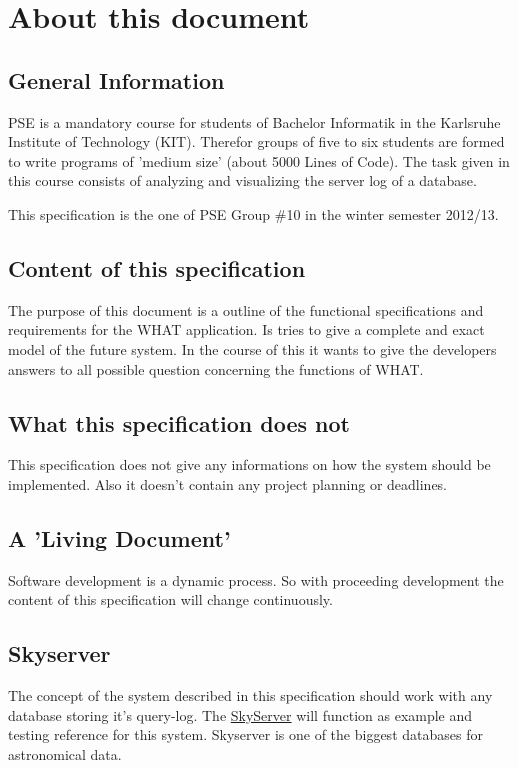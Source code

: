 \section*{About this document}

\subsection*{General Information}
PSE is a mandatory course for students of Bachelor Informatik in the %
Karlsruhe Institute of Technology (KIT). Therefor groups of five to six
students are formed to write programs of 'medium size' (about 5000 Lines of Code). 
The task given in this course consists of analyzing and visualizing the server log of a database.

This specification is the one of PSE Group \#10 in the winter semester 2012/13.


\subsection*{Content of this specification}
The purpose of this document is a outline of the functional specifications and requirements
for the WHAT application. Is tries to give a complete and exact model of the future system.
In the course of this it wants to give the developers answers to all possible question concerning
the functions of WHAT.


\subsection*{What this specification does not}
This specification does not give any informations on how the system should be implemented. Also it doesn't 
contain any project planning or deadlines.


\subsection*{A 'Living Document'}
Software development is a dynamic process. So with proceeding development the
content of this specification will change continuously. 


\subsection*{Skyserver}
The concept of the system described in this specification should work with any database
storing it's query-log. The \href{http://skyserver.sdss.org/public/en/}{SkyServer} will function
as example and testing reference for this system. Skyserver is one of the biggest databases for astronomical data.


